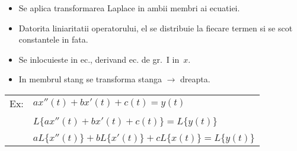 \documentclass{article}
\begin{document}
\begin{itemize}
  \item Se aplica transformarea Laplace in ambii membri ai ecuatiei.
  \item Datorita liniaritatii operatorului, el se distribuie la fiecare termen si se scot constantele in fata.
  \item Se inlocuieste in ec., derivand ec. de gr.~I in~$x$.
  \item In membrul stang se transforma stanga $\longrightarrow$ dreapta.
\end{itemize}

\begin{tabular}{cl}
  Ex: & $ ax''(t) + bx'(t) + c(t) = y(t) $                      \\\\
      & $ L\{ ax''(t) + bx'(t) + c(t) \} = L\{y(t)\}  $         \\\\
      & $ aL\{x''(t)\} + bL\{x'(t)\} + cL\{x(t)\} = L\{y(t)\} $ \\
\end{tabular}
\end{document}
